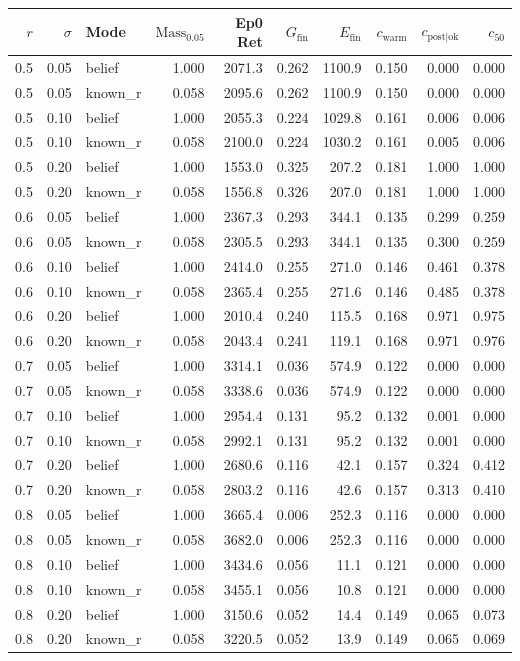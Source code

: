 \begin{tabular}{rrlrrrrrrr}
\toprule
$r$ & $\sigma$ & Mode & $\text{Mass}_{0.05}$ & Ep0 Ret & $G_{\text{fin}}$ & $E_{\text{fin}}$ & $c_{\text{warm}}$ & $c_{\text{post|ok}}$ & $c_{50}$ \\
\midrule
0.5 & 0.05 & belief & 1.000 & 2071.3 & 0.262 & 1100.9 & 0.150 & 0.000 & 0.000 \\
0.5 & 0.05 & known\_r & 0.058 & 2095.6 & 0.262 & 1100.9 & 0.150 & 0.000 & 0.000 \\
0.5 & 0.10 & belief & 1.000 & 2055.3 & 0.224 & 1029.8 & 0.161 & 0.006 & 0.006 \\
0.5 & 0.10 & known\_r & 0.058 & 2100.0 & 0.224 & 1030.2 & 0.161 & 0.005 & 0.006 \\
0.5 & 0.20 & belief & 1.000 & 1553.0 & 0.325 & 207.2 & 0.181 & 1.000 & 1.000 \\
0.5 & 0.20 & known\_r & 0.058 & 1556.8 & 0.326 & 207.0 & 0.181 & 1.000 & 1.000 \\
\midrule
0.6 & 0.05 & belief & 1.000 & 2367.3 & 0.293 & 344.1 & 0.135 & 0.299 & 0.259 \\
0.6 & 0.05 & known\_r & 0.058 & 2305.5 & 0.293 & 344.1 & 0.135 & 0.300 & 0.259 \\
0.6 & 0.10 & belief & 1.000 & 2414.0 & 0.255 & 271.0 & 0.146 & 0.461 & 0.378 \\
0.6 & 0.10 & known\_r & 0.058 & 2365.4 & 0.255 & 271.6 & 0.146 & 0.485 & 0.378 \\
0.6 & 0.20 & belief & 1.000 & 2010.4 & 0.240 & 115.5 & 0.168 & 0.971 & 0.975 \\
0.6 & 0.20 & known\_r & 0.058 & 2043.4 & 0.241 & 119.1 & 0.168 & 0.971 & 0.976 \\
\midrule
0.7 & 0.05 & belief & 1.000 & 3314.1 & 0.036 & 574.9 & 0.122 & 0.000 & 0.000 \\
0.7 & 0.05 & known\_r & 0.058 & 3338.6 & 0.036 & 574.9 & 0.122 & 0.000 & 0.000 \\
0.7 & 0.10 & belief & 1.000 & 2954.4 & 0.131 & 95.2 & 0.132 & 0.001 & 0.000 \\
0.7 & 0.10 & known\_r & 0.058 & 2992.1 & 0.131 & 95.2 & 0.132 & 0.001 & 0.000 \\
0.7 & 0.20 & belief & 1.000 & 2680.6 & 0.116 & 42.1 & 0.157 & 0.324 & 0.412 \\
0.7 & 0.20 & known\_r & 0.058 & 2803.2 & 0.116 & 42.6 & 0.157 & 0.313 & 0.410 \\
\midrule
0.8 & 0.05 & belief & 1.000 & 3665.4 & 0.006 & 252.3 & 0.116 & 0.000 & 0.000 \\
0.8 & 0.05 & known\_r & 0.058 & 3682.0 & 0.006 & 252.3 & 0.116 & 0.000 & 0.000 \\
0.8 & 0.10 & belief & 1.000 & 3434.6 & 0.056 & 11.1 & 0.121 & 0.000 & 0.000 \\
0.8 & 0.10 & known\_r & 0.058 & 3455.1 & 0.056 & 10.8 & 0.121 & 0.000 & 0.000 \\
0.8 & 0.20 & belief & 1.000 & 3150.6 & 0.052 & 14.4 & 0.149 & 0.065 & 0.073 \\
0.8 & 0.20 & known\_r & 0.058 & 3220.5 & 0.052 & 13.9 & 0.149 & 0.065 & 0.069 \\
\bottomrule
\end{tabular}
